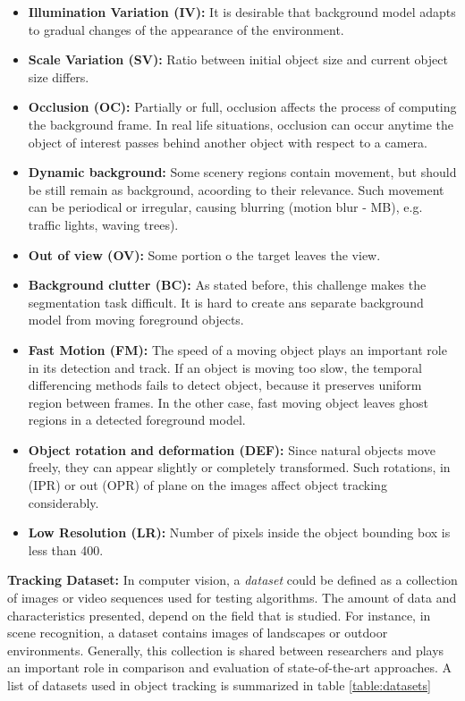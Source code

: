 \begin{itemize}
\item \textbf{Illumination Variation (IV):} It is desirable that background
model adapts to gradual changes of the appearance of the environment.
\item \textbf{Scale Variation (SV):} Ratio between initial object size and
current object size differs.
\item \textbf{Occlusion (OC):} Partially or full, occlusion affects the process
of computing the background frame. In real life situations, occlusion can occur
anytime the object of interest passes behind another object with respect to a
camera.
\item \textbf{Dynamic background:} Some scenery regions contain movement, but
should be still remain as background, acoording to their relevance. Such
movement can be periodical or irregular, causing blurring (motion blur - MB),
e.g. traffic lights, waving trees).
\item \textbf{Out of view (OV): } Some portion o the target leaves the view.
\item \textbf{Background clutter (BC):} As stated before, this challenge makes
the segmentation task difficult. It is hard to create ans separate background
model from moving foreground objects.
\item \textbf{Fast Motion (FM):} The speed of a moving object plays an
important role in its detection and track. If an object is moving too slow,
the temporal differencing methods fails to detect object, because it preserves
uniform region between frames. In the other case, fast moving object leaves
ghost regions in a detected foreground model.
\item \textbf{Object rotation and deformation (DEF):} Since natural objects
move freely, they can appear slightly or completely transformed. Such
rotations, in (IPR) or out (OPR) of plane on the images affect object tracking
considerably.
\item \textbf{Low Resolution (LR):} Number of pixels inside the object
bounding box is less than 400.
\end{itemize}

\textbf{Tracking Dataset: } In computer vision, a \textit{dataset} could be
defined as a collection of
images or video sequences used for testing algorithms. The amount of data and
characteristics presented, depend on the field that is studied.
For instance, in scene recognition, a dataset contains images of landscapes or
outdoor environments. Generally, this collection is shared between researchers
and plays an important role in comparison and evaluation of state-of-the-art
approaches. A list of datasets used in object tracking is summarized in table
\ref{table:datasets}

